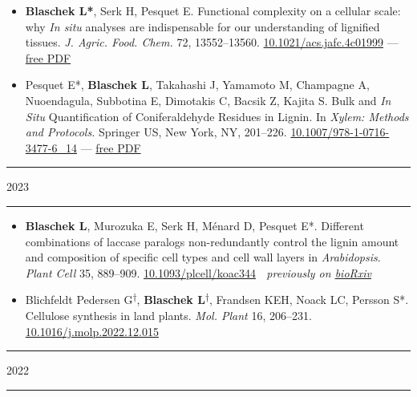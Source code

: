 \documentclass[11pt]{article}
\newcommand*{\xdash}[1][3em]{\rule[0.5ex]{#1}{0.55pt}}
\begin{document}
\vspace{-0.175cm}	
\begin{itemize}[label={},itemindent=-9pt,leftmargin=24pt]
	\itemsep-0.1cm
	\item \textbf{Blaschek L*}, Serk H, Pesquet E. Functional complexity on a cellular scale: why \textit{In situ} analyses are indispensable for our understanding of lignified tissues. \textit{J. Agric. Food. Chem.} 72, 13552--13560. \href{https://doi.org/10.1021/acs.jafc.4c01999}{10.1021/acs.jafc.4c01999} — \href{https://leonardblaschek.github.io/assets/pdf/10_1021_acs_jafc_4c01999.pdf}{free PDF}
	\item Pesquet E*, \textbf{Blaschek L}, Takahashi J,	Yamamoto M, Champagne A, Nuoendagula, Subbotina E, Dimotakis C, Bacsik Z, Kajita S. Bulk and \textit{In Situ} Quantification of Coniferaldehyde Residues in Lignin. In \textit{Xylem: Methods and Protocols.} Springer US, New York, NY, 201–226. \href{https://doi.org/10.1007/978-1-0716-3477-6_14}{10.1007/978-1-0716-3477-6\_14} — \href{https://leonardblaschek.github.io/assets/pdf/10_1007_978-1-0716-3477-6_14.pdf}{free PDF}
\end{itemize}

\hspace*{\fill} \xdash[6em] \large{\textsc{2023}} \xdash[6em] \hspace*{\fill} \normalsize

\vspace{-0.175cm}	
\begin{itemize}[label={},itemindent=-9pt,leftmargin=24pt]
	\itemsep-0.1cm
	\item \textbf{Blaschek L}, Murozuka E, Serk H, Ménard D, Pesquet E*. Different combinations of laccase paralogs non-redundantly control the lignin amount and composition of specific cell types and cell wall layers in \textit{Arabidopsis}. \textit{Plant Cell} 35, 889–909. \href{https://doi.org/10.1093/plcell/koac344}{10.1093/plcell/koac344} \textemdash $\;$ \textit{previously on \href{https://doi.org/10.1101/2022.05.04.490011}{bioRxiv}}
	\item Blichfeldt Pedersen G\textsuperscript{$\dagger$}, \textbf{Blaschek L}\textsuperscript{$\dagger$}, Frandsen KEH, Noack LC, Persson S*. Cellulose synthesis in land plants. \textit{Mol. Plant} 16, 206–231. \href{https://doi.org/10.1016/j.molp.2022.12.015}{10.1016/j.molp.2022.12.015}
\end{itemize}

\hspace*{\fill} \xdash[6em] \large{\textsc{2022}} \xdash[6em] \hspace*{\fill} \normalsize
\end{document}
